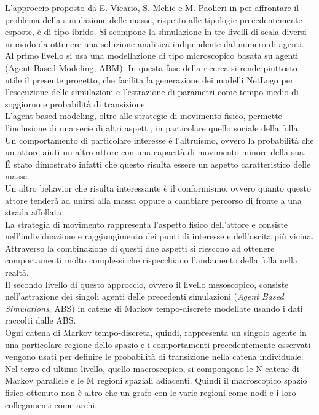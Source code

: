 L'approccio proposto da E. Vicario, S. Mehic e M. Paolieri  in \cite{hierarchical-report} per affrontare il problema della simulazione delle masse, rispetto alle tipologie precedentemente esposte, è di tipo ibrido. Si scompone la simulazione in tre livelli di scala diversi in modo da ottenere una soluzione analitica indipendente dal numero di agenti.\\
Al primo livello si usa una modellazione di tipo microscopico basata su agenti (Agent Based Modeling, ABM). In questa fase della ricerca si rende piuttosto utile il presente progetto, che facilita la generazione dei modelli NetLogo per l'esecuzione delle simulazioni e l'estrazione di parametri come tempo medio di soggiorno e probabilità di transizione.\\
L'agent-based modeling, oltre alle strategie di movimento fisico, permette l'inclusione di una serie di altri aspetti, in particolare quello sociale della folla.\\
Un comportamento di particolare interesse è l'altruismo, ovvero la probabilità che un attore aiuti un altro attore con una capacità di movimento minore della sua. \'E stato dimostrato infatti che questo risulta essere un aspetto caratteristico delle masse.\\
Un altro behavior che risulta interessante è il conformismo, ovvero quanto questo attore tenderà ad unirsi alla massa oppure a cambiare percorso di fronte a una strada affollata.\\
La strategia di movimento rappresenta l'aspetto fisico dell'attore e consiste nell'individuazione e raggiungimento dei punti di interesse e dell'uscita più vicina.\\
Attraverso la combinazione di questi due aspetti si riescono ad ottenere comportamenti molto complessi che rispecchiano l'andamento della folla nella realtà.\\
Il secondo livello di questo approccio, ovvero il livello mesoscopico, consiste nell'astrazione dei singoli agenti delle precedenti simulazioni (\textit{Agent Based Simulations}, ABS) in catene di Markov tempo-discrete modellate usando i dati raccolti dalle ABS.\\
Ogni catena di Markov tempo-discreta, quindi, rappresenta un singolo agente in una particolare regione dello spazio e i comportamenti precedentemente osservati vengono usati per definire le probabilità di transizione nella catena individuale.\\
Nel terzo ed ultimo livello, quello macroscopico, si compongono le N catene di Markov parallele e le M regioni spaziali adiacenti. Quindi il macroscopico spazio fisico ottenuto non è altro che un grafo con le varie regioni come nodi e i loro collegamenti come archi.\\
